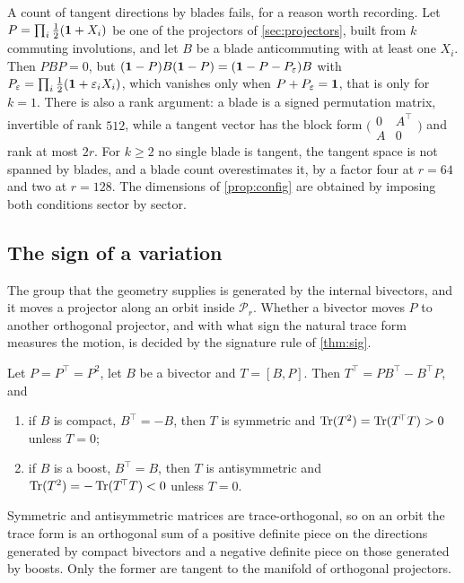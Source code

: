 \begin{remark}
\label{rem:noblade}
A count of tangent directions by blades fails, for a reason worth recording. Let $P=\prod_i\tfrac12(\mathbf 1+X_i)$ be one of the
projectors of \cref{sec:projectors}, built from $k$ commuting involutions, and let $B$ be a blade anticommuting with at least one
$X_i$. Then $PBP=0$, but $(\mathbf 1-P)B(\mathbf 1-P)=(\mathbf 1-P-P_\varepsilon)B$ with $P_\varepsilon=\prod_i\tfrac12(\mathbf 1+\varepsilon_iX_i)$, which
vanishes only when $P+P_\varepsilon=\mathbf 1$, that is only for $k=1$. There is also a rank argument: a blade is a signed permutation matrix,
invertible of rank $512$, while a tangent vector has the block form $\bigl(\begin{smallmatrix}0&A^{\!\top}\\A&0\end{smallmatrix}\bigr)$ and
rank at most $2r$. For $k\ge2$ no single blade is tangent, the tangent space is not spanned by blades, and a blade count
overestimates it, by a factor four at $r=64$ and two at $r=128$. The dimensions of \cref{prop:config} are obtained by imposing
both conditions sector by sector.
\end{remark}

\subsection{The sign of a variation}

The group that the geometry supplies is generated by the internal bivectors, and it moves a projector along an orbit inside
$\mathcal P_r$. Whether a bivector moves $P$ to another orthogonal projector, and with what sign the natural trace form measures
the motion, is decided by the signature rule of \cref{thm:sig}.

\begin{theorem}
\label{thm:ghost}
Let $P=P^{\!\top}=P^2$, let $B$ be a bivector and $T=[B,P]$. Then $T^{\!\top}=PB^{\!\top}-B^{\!\top}P$, and
\begin{enumerate}[label=(\roman*),leftmargin=2.2em]
\item if $B$ is compact, $B^{\!\top}=-B$, then $T$ is symmetric and $\operatorname{Tr}(T^2)=\operatorname{Tr}(T^{\!\top}T)>0$ unless $T=0$;
\item if $B$ is a boost, $B^{\!\top}=B$, then $T$ is antisymmetric and $\operatorname{Tr}(T^2)=-\operatorname{Tr}(T^{\!\top}T)<0$ unless $T=0$.
\end{enumerate}
Symmetric and antisymmetric matrices are trace-orthogonal, so on an orbit the trace form is an orthogonal sum of a positive
definite piece on the directions generated by compact bivectors and a negative definite piece on those generated by boosts. Only
the former are tangent to the manifold of orthogonal projectors.
\end{theorem}

